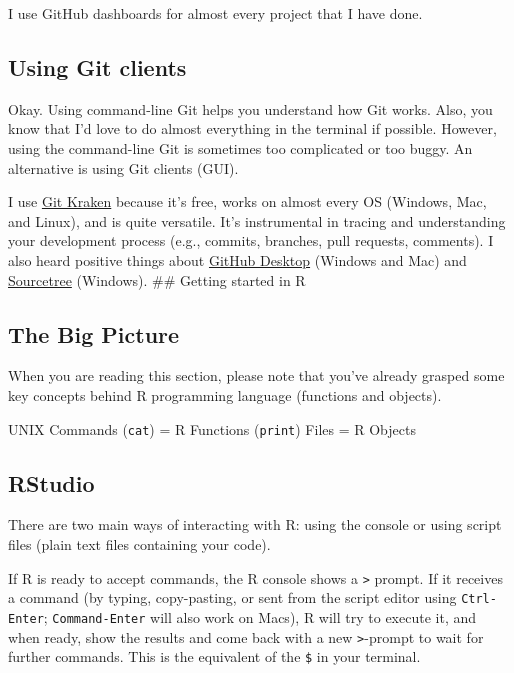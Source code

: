 \documentclass[
]{book}
\begin{document}
I use GitHub dashboards for almost every project that I have done.

\subsection{Using Git clients}\label{using-git-clients}

Okay. Using command-line Git helps you understand how Git works. Also, you know that I'd love to do almost everything in the terminal if possible. However, using the command-line Git is sometimes too complicated or too buggy. An alternative is using Git clients (GUI).

I use \href{https://www.gitkraken.com/}{Git Kraken} because it's free, works on almost every OS (Windows, Mac, and Linux), and is quite versatile. It's instrumental in tracing and understanding your development process (e.g., commits, branches, pull requests, comments). I also heard positive things about \href{https://desktop.github.com/}{GitHub Desktop} (Windows and Mac) and \href{https://www.sourcetreeapp.com/}{Sourcetree} (Windows).
\#\# Getting started in R

\subsection{The Big Picture}\label{the-big-picture-2}

When you are reading this section, please note that you've already grasped some key concepts behind R programming language (functions and objects).

UNIX Commands (\texttt{cat}) = R Functions (\texttt{print})
Files = R Objects

\subsection{RStudio}\label{rstudio}

There are two main ways of interacting with R: using the console or using script files (plain text files containing your code).

If R is ready to accept commands, the R console shows a \texttt{\textgreater{}} prompt. If it receives a command (by typing, copy-pasting, or sent from the script editor using \texttt{Ctrl-Enter}; \texttt{Command-Enter} will also work on Macs), R will try to execute it, and when ready, show the results and come back with a new \texttt{\textgreater{}}-prompt to wait for further commands. This is the equivalent of the \texttt{\$} in your terminal.
\end{document}
